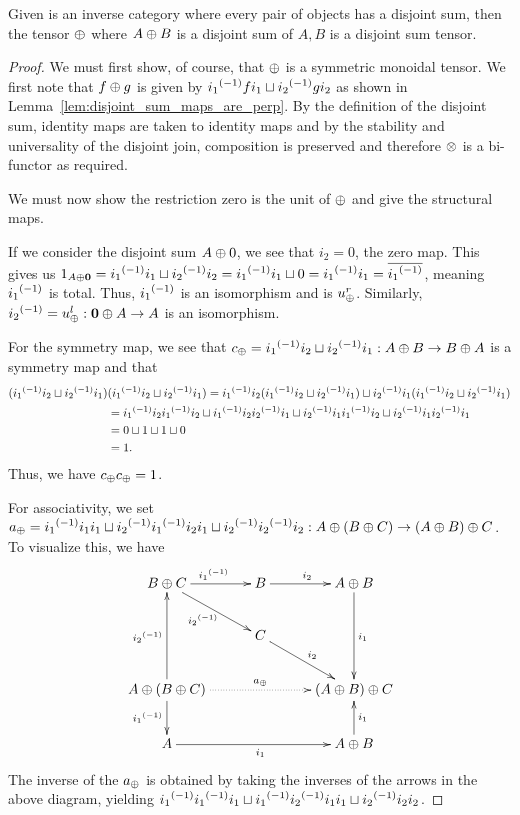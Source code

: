 \begin{proposition}\label{prop:enough_disjoint_sums_make_a_disjoint_sum_tensor}
  Given \X is an inverse category where every pair of objects has a disjoint sum, then the tensor
  $\oplus$ where $A\oplus B$ is a disjoint sum of $A,B$ is a disjoint sum tensor.
\end{proposition}
\begin{proof}
  We must first show, of course, that $\oplus$ is a symmetric monoidal tensor. We first note that $f\oplus g$ is
  given by   ${i_1}^{(-1)} f i_1 \sqcup {i_2}^{(-1)} g i_2$ as shown in
  Lemma~\ref{lem:disjoint_sum_maps_are_perp}. By the definition of the disjoint sum, identity maps
  are taken to identity maps and by the stability and universality of the disjoint join, composition
  is preserved and therefore $\otimes$ is a bi-functor as required.

  We must now show the restriction zero is the unit of $\oplus$ and give the structural maps.

  If we consider the disjoint sum $A\oplus0$, we see that $i_2 = 0$, the zero map. This gives us
  $1_{A\oplus\mathbf{0}}  = {i_1}^{(-1)}i_1 \sqcup {i_2}^{(-1)}i_2 = {i_1}^{(-1)}i_1 \sqcup 0 = {i_1}^{(-1)}i_1 =
    \overline{{i_1}^{(-1)}}$, meaning ${i_1}^{(-1)}$ is total. Thus, ${i_1}^{(-1)}$ is an isomorphism and is
  $u_{\oplus}^r$. Similarly, ${i_2}^{(-1)} = u_{\oplus}^l:\mathbf{0}\oplus A \to A$ is an isomorphism.

  For the symmetry map, we see that $c_\oplus = {i_1}^{(-1)}i_2 \sqcup {i_2}^{(-1)}i_1: A\oplus B \to B\oplus A$ is a symmetry
  map and that
  \begin{align*}
    ({i_1}^{(-1)}i_2 \sqcup {i_2}^{(-1)}i_1)&({i_1}^{(-1)}i_2 \sqcup {i_2}^{(-1)}i_1)={i_1}^{(-1)}i_2({i_1}^{(-1)}i_2
    \sqcup {i_2}^{(-1)}i_1) \sqcup {i_2}^{(-1)}i_1({i_1}^{(-1)}i_2 \sqcup {i_2}^{(-1)}i_1)\\
    &={i_1}^{(-1)}i_2{i_1}^{(-1)}i_2 \sqcup {i_1}^{(-1)}i_2{i_2}^{(-1)}i_1 \sqcup {i_2}^{(-1)}i_1{i_1}^{(-1)}i_2
    \sqcup {i_2}^{(-1)}i_1{i_2}^{(-1)}i_1\\
    & = 0 \sqcup 1 \sqcup 1 \sqcup 0 \\
    & = 1.
  \end{align*}
  Thus, we have $c_\oplus c_\oplus =1$.

  For associativity, we set $a_\oplus = {i_1}^{(-1)}i_1i_1 \sqcup {i_2}^{(-1)}{i_1}^{(-1)}i_2i_1 \sqcup {i_2}^{(-1)}
  {i_2}^{(-1)} i_2:A\oplus(B\oplus C) \to (A\oplus B)\oplus C$.
  To visualize this, we have
  \[
    \xymatrix@C+5pt{
      B\+C \ar[r]^{\inv{i_1}} \ar[dr]_{\inv{i_2}}
        & B \ar[r]^{i_2}
        & A\+B \ar[dd]^{i_1}\\
      & C \ar[dr]^{i_2} & \\
      A\+(B\+C)\ar[uu]^{\inv{i_2}} \ar[d]_{\inv{i_1}} \ar@{.>}[rr]^{a_{\+}} && (A\+B)\+C \\
      A \ar[rr]_{i_1} & & A\+B \ar[u]_{i_1}
    }
  \]
  The inverse of the $a_\oplus$ is obtained by taking the inverses of the arrows in the above diagram,
  yielding ${i_1}^{(-1)}{i_1}^{(-1)}i_1 \sqcup {i_1}^{(-1)}{i_2}^{(-1)}i_1i_1 \sqcup {i_2}^{(-1)}i_2 i_2$.


\end{proof}
